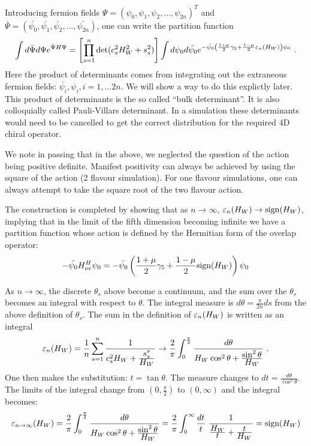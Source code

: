 \documentclass[12pt]{article}
\begin{document}
Introducing fermion fields $\Psi = (\psi_0, \psi_1, \psi_2, \ldots, \psi_{2n} )^T$ and $\bar{\Psi} = (\bar{\psi_0}, \bar{\psi_1}, \bar{\psi_2}, \ldots, \bar{\psi_{2n}} )$, one can write the partition function
\begin{equation}
\int d \bar{\Psi} d\Psi e^{\bar{\Psi} H \Psi}  = \left[ \prod_{s=1}^{n} \det( c_s^2 H_W^2 + s_s^2 ) \right] 
\int d\psi_0 d \bar{\psi_0}
 e^{ -\bar{\psi_0} \left( \frac{1+\mu}{2} \gamma_5 + \frac{1-\mu}{2} \varepsilon_{n} (H_W) \right) \psi_0} \ .
\end{equation} 
Here the product of determinants comes from integrating out the extraneous fermion fields: $\bar{\psi_{i}},\psi_{i}, i=1,\ldots 2n$. We will show a way to do this explictly later. This product of determinants is the so called ``bulk determinant''. It is also colloquially called Pauli-Villars determinant. In a simulation
these determinants would need to be cancelled to get the correct
distribution for the required 4D chiral operator.

We note in passing that in the above, we neglected the question of the 
action being positive definite. Manifest positivity  can always be
achieved by using the square of the action (2 flavour simulation).
For one flavour simulations, one can always attempt to take the square
root of the two flavour action.

The construction is completed by showing that as $n\rightarrow \infty$, 
$\varepsilon_{n}(H_W) \rightarrow {\rm sign}(H_W)$, implying that in the limit
of the fifth dimension becoming infinite we have a partition function whose
action is defined by the Hermitian form of the overlap operator:
\begin{equation}
-\bar{\psi_0} H_{ov}^{H}\psi_0 = -\bar{\psi_0} \left( \frac{1+\mu}{2}\gamma_5 + \frac{1-\mu}{2} {\rm sign}(H_W) \right) \psi_0
\end{equation}

As $n \rightarrow \infty$, the discrete $\theta_s$ above become a continuum, and the sum over the $\theta_{s}$ becomes an integral with respect to $\theta$. The integral measure is $d\theta = \frac{\pi}{2n} ds$ from the 
above definition of $\theta_s$.  The sum in the definition of $\varepsilon_{n}(H_W)$ is written as an integral
\begin{equation} 
\varepsilon_{n}(H_W) = \frac{1}{n}\sum_{s=1}^{n} \frac{1}{c_s^2 H_W + \frac{\displaystyle s_s^s}{\displaystyle H_W}} \rightarrow \frac{2}{\pi}\int_{0}^{\frac{\pi}{2}} \frac{d\theta}{ H_W \cos^2 \theta + \frac{\displaystyle \sin^2 \theta }{\displaystyle H_W}}  \ .
\end{equation}
One then makes the substitution: $t = \tan \theta$. The measure changes
to $ dt = \frac{d\theta}{\cos^2 \theta} $. The limits of the integral
change from $(0, \frac{\pi}{2})$ to $(0, \infty)$ and the integral becomes:
\begin{equation}
\eps_{ n\rightarrow \infty }(H_W) =   \frac{2}{\pi}\int_{0}^{\frac{\pi}{2}} \frac{d\theta}{ H_W \cos^2 \theta + \frac{\displaystyle \sin^2 \theta }{\displaystyle H_W}} = \frac{2}{\pi} \int_{0}^{\infty} \frac{dt}{t} \ \frac{1}{\frac{\displaystyle H_W}{\displaystyle t} + \frac{\displaystyle t}{\displaystyle H_W} } = {\rm sign}(H_W)
\end{equation}
\end{document}
